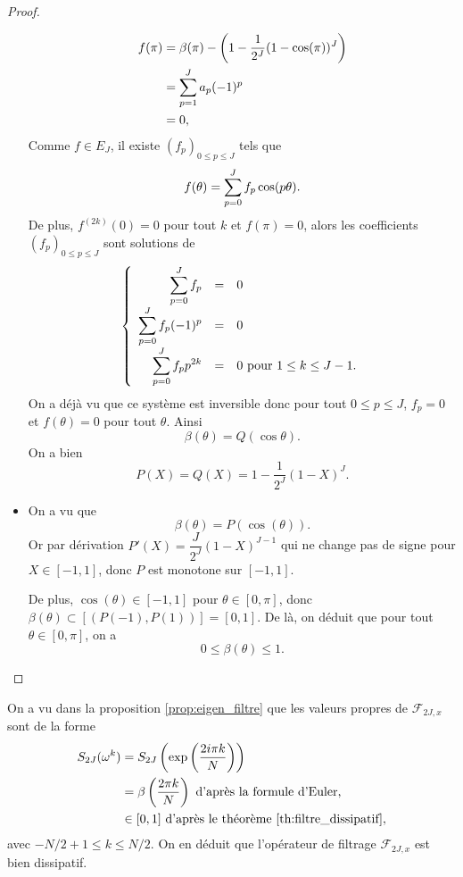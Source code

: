 \begin{proof}
\begin{itemize}
\begin{align*}
f(\pi) & = \beta(\pi) - \left( 1-\dfrac{1}{2^J}(1 - \cos (\pi))^J \right) \\
	& = \displaystyle\sum\limits_{p=1}^J a_p(-1)^p \\
	& = 0,
\end{align*}
Comme $f \in E_J$, il existe $(f_p)_{0 \leq p \leq J}$ tels que
\begin{equation}
f(\theta) = \displaystyle\sum\limits_{p=0}^J f_p \cos (p \theta).
\end{equation}
De plus, $f^{(2k)}(0)=0$ pour tout $k$ et $f(\pi)=0$, alors les coefficients $(f_p)_{0 \leq p \leq J}$ sont solutions de 
\begin{equation}
\left\lbrace
\begin{array}{rcl}
\displaystyle\sum\limits_{p=0}^J f_p & = & 0 \\
\displaystyle\sum\limits_{p=0}^J f_p (-1)^p & = & 0 \\
\displaystyle\sum\limits_{p=0}^J f_p p^{2k} & = & 0 \text{ pour } 1 \leq k \leq J-1.
\end{array}
\right.
\end{equation}
On a déjà vu que ce système est inversible donc pour tout $0 \leq p \leq J$, $f_p = 0$ et $f(\theta) = 0$ pour tout $\theta$. Ainsi 
\begin{equation}
\beta(\theta) = Q(\cos\theta).
\end{equation}
On a bien
\begin{equation}
P(X) = Q(X) = 1-\dfrac{1}{2^J}(1-X)^J.
\end{equation}

\item On a vu que
\begin{equation}
\beta(\theta) = P(\cos (\theta)).
\end{equation}
Or par dérivation $P'(X) =  \dfrac{J}{2^J}(1-X)^{J-1}$ qui ne change pas de signe pour $X \in [-1,1]$, donc $P$ est monotone sur $[-1,1]$.

De plus, $\cos(\theta) \in [-1,1]$ pour $\theta \in [0, \pi]$, donc $\beta(\theta) \subset [(P(-1), P(1))] = [0,1]$. De là, on déduit que pour tout $\theta \in [0,\pi]$, on a
\begin{equation}
0 \leq \beta(\theta) \leq 1.
\end{equation} 
\end{itemize}
\end{proof}

\begin{remarque}
On a vu dans la proposition \ref{prop:eigen_filtre} que les valeurs propres de $\mathcal{F}_{2J,x}$ sont de la forme
\begin{align*}
S_{2J}(\omega^k) & = S_{2J}\left(\exp \left( \dfrac{2 i \pi k}{N} \right) \right) \\
	& = \beta \left(\dfrac{2 \pi k}{N} \right) \text{ d'après la formule d'Euler,}\\
	& \in [0,1] \text{ d'après le théorème } \ref{th:filtre_dissipatif},
\end{align*}
avec $-N/2+1 \leq k \leq N/2$. On en déduit que l'opérateur de filtrage $\mathcal{F}_{2J,x}$ est bien dissipatif.
\end{remarque}

